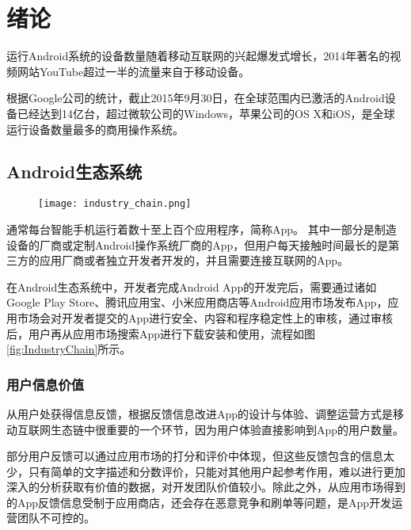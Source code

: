 
\chapter{绪论}
\label{chap:intro}

运行Android系统的设备数量随着移动互联网的兴起爆发式增长，2014年著名的视频网站YouTube超过一半的流量来自于移动设备\parencite{youtube}。

根据Google公司的统计，截止2015年9月30日，在全球范围内已激活的Android设备已经达到14亿台\parencite{android_device}，超过微软公司的Windows，苹果公司的OS X和iOS，是全球运行设备数量最多的商用操作系统。

\section{Android生态系统}
\label{sec:android_ecosystem}

\begin{figure}[!htp]
	\centering
	\texttt{[image: industry\_chain.png]}
\end{figure}

通常每台智能手机运行着数十至上百个应用程序，简称App。
其中一部分是制造设备的厂商或定制Android操作系统厂商的App，但用户每天接触时间最长的是第三方的应用厂商或者独立开发者开发的，并且需要连接互联网的App。

在Android生态系统中，开发者完成Android App的开发完后，需要通过诸如Google Play Store、腾讯应用宝、小米应用商店等Android应用市场发布App，应用市场会对开发者提交的App进行安全、内容和程序稳定性上的审核，通过审核后，用户再从应用市场搜索App进行下载安装和使用，流程如图\ref{fig:IndustryChain}所示。

\subsection{用户信息价值}

从用户处获得信息反馈，根据反馈信息改进App的设计与体验、调整运营方式是移动互联网生态链中很重要的一个环节，因为用户体验直接影响到App的用户数量。

部分用户反馈可以通过应用市场的打分和评价中体现，但这些反馈包含的信息太少，只有简单的文字描述和分数评价，只能对其他用户起参考作用，难以进行更加深入的分析获取有价值的数据，对开发团队价值较小。除此之外，从应用市场得到的App反馈信息受制于应用商店，还会存在恶意竞争和刷单等问题，是App开发运营团队不可控的。

